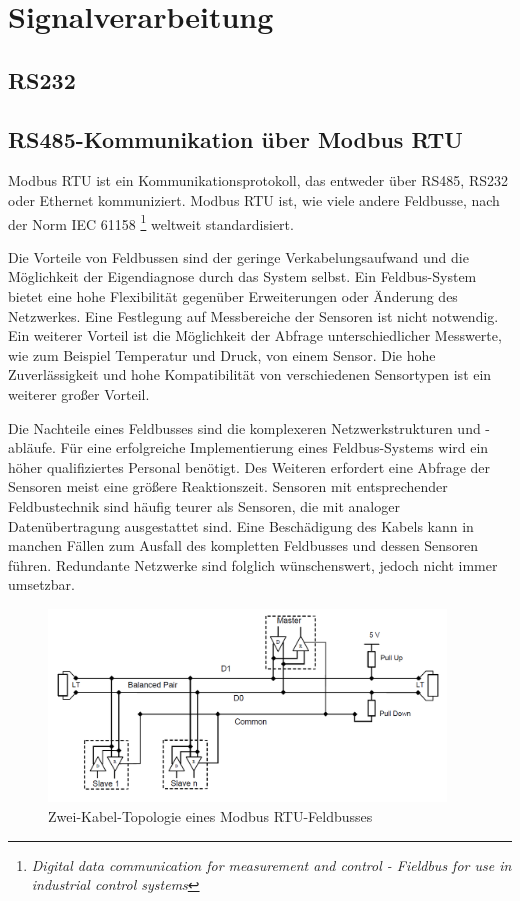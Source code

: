 \section{Signalverarbeitung}
\label{sec: Modbus RTU}

\subsection{RS232}
\label{subsec:RS232}

\subsection{RS485-Kommunikation über Modbus RTU}
\label{subsec:RS485}

Modbus RTU ist ein Kommunikationsprotokoll, das entweder über RS485, RS232 oder Ethernet kommuniziert. Modbus RTU ist, wie viele andere Feldbusse, nach der Norm IEC 61158 \footnote{\textit{Digital data communication for measurement and control - Fieldbus for use in industrial control systems}} weltweit standardisiert.

Die Vorteile von Feldbussen sind der geringe Verkabelungsaufwand und die Möglichkeit der Eigendiagnose durch das System selbst. Ein Feldbus-System bietet eine hohe Flexibilität gegenüber Erweiterungen oder Änderung des Netzwerkes. Eine Festlegung auf Messbereiche der Sensoren ist nicht notwendig. Ein weiterer Vorteil ist die Möglichkeit der Abfrage unterschiedlicher Messwerte, wie zum Beispiel Temperatur und Druck, von einem Sensor. Die hohe Zuverlässigkeit und hohe Kompatibilität von verschiedenen Sensortypen ist ein weiterer großer Vorteil.

Die Nachteile eines Feldbusses sind die komplexeren Netzwerkstrukturen und -abläufe. Für eine erfolgreiche Implementierung eines Feldbus-Systems wird ein höher qualifiziertes Personal benötigt. Des Weiteren erfordert eine Abfrage der Sensoren meist eine größere Reaktionszeit. Sensoren mit  entsprechender Feldbustechnik sind häufig teurer als Sensoren, die mit analoger Datenübertragung ausgestattet sind. Eine Beschädigung des Kabels kann in manchen Fällen zum Ausfall des kompletten Feldbusses und dessen Sensoren führen. Redundante Netzwerke sind folglich wünschenswert, jedoch nicht immer umsetzbar. 

\begin{figure}[htb]
 \centering		\includegraphics[width=0.94\textwidth]{Pictures/TopologieModbus.png}
 \caption{Zwei-Kabel-Topologie eines Modbus RTU-Feldbusses \citep{MODBUS.ORG2002}  }
 \label{fig:ZweiKabelModbus}
 \end{figure} 
 
